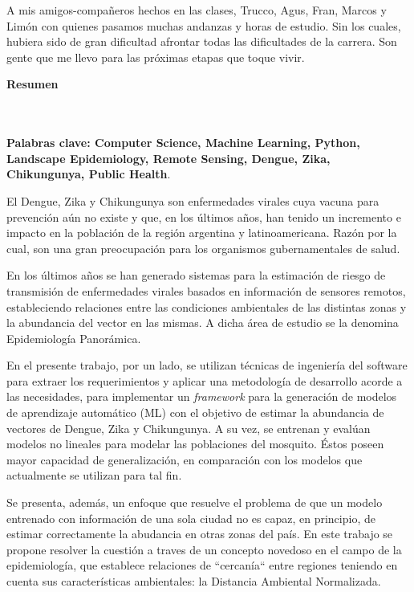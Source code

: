   \par A mis amigos-compañeros hechos en las clases, Trucco, Agus, Fran, Marcos
  y Limón con quienes pasamos muchas andanzas y horas de estudio. Sin los
  cuales, hubiera sido de gran dificultad afrontar todas las dificultades
  de la carrera. Son gente que
  me llevo para las próximas etapas que toque vivir.


\newpage{\pagestyle{empty}\cleardoublepage}

\newpage
\textbf{\LARGE Resumen}
\\\\

\textbf{\small Palabras clave: Computer Science, Machine Learning, Python,
      Landscape Epidemiology, Remote Sensing, Dengue, Zika, Chikungunya, Public Health}.\\
\justifying
  \par El Dengue, Zika y Chikungunya son enfermedades virales cuya vacuna para
    prevención aún no existe y que, en los últimos años, han tenido un incremento
    e impacto en la población de la región argentina y latinoamericana. Razón
    por la cual, son
    una gran preocupación para los organismos gubernamentales de salud.

  \par En los últimos años se han generado sistemas para la estimación de riesgo de transmisión
    de enfermedades virales basados en información de sensores remotos,
    estableciendo relaciones entre las condiciones ambientales de las distintas
    zonas y la abundancia del vector en las mismas. A dicha área de estudio
    se la denomina Epidemiología Panorámica.

 \par En el presente trabajo, por un lado, se utilizan técnicas de
    ingeniería del software para extraer los requerimientos y aplicar una metodología
    de desarrollo acorde a las necesidades,
    para implementar un \textit{framework} para la generación de modelos de
    aprendizaje automático (ML) con el objetivo
    de estimar la abundancia de vectores de Dengue, Zika y Chikungunya.
    A su vez, se entrenan y evalúan modelos no lineales para modelar las poblaciones del
    mosquito. Éstos poseen mayor
    capacidad de generalización, en comparación con los modelos que
    actualmente se utilizan para tal fin.

  \par Se presenta, además, un enfoque que resuelve el problema de que
    un modelo entrenado con información de una sola ciudad no es capaz,
    en principio, de estimar correctamente la abudancia en otras zonas del país.
    En este trabajo
    se propone resolver la cuestión a traves de un concepto novedoso en el campo
    de la epidemiología, que establece
    relaciones de ``cercanía``
    entre regiones teniendo en cuenta sus características
    ambientales: la Distancia Ambiental Normalizada.
